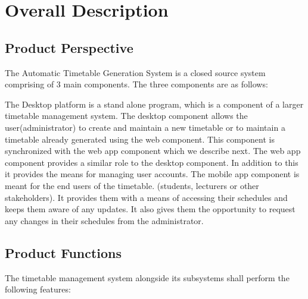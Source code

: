 \documentclass{scrreprt}
\begin{document}
\chapter{Overall Description}

\section{Product Perspective}
  The Automatic Timetable Generation System is a closed source system comprising of 3  main components. The three components are as follows:
  
The Desktop platform is a stand alone program, which is a component of a larger timetable management system. The desktop component allows the user(administrator) to create and maintain a new timetable or to maintain a timetable already generated using the web component. This component is synchronized with the web app component which we describe next. The web app component provides a similar role to the desktop component. In addition to this it provides the means for managing user accounts. The mobile app component is meant for the end users of the timetable. (students, lecturers or other stakeholders). It provides them with a means of accessing their schedules and keeps them aware of any  updates. It also gives them the opportunity to request any changes in their schedules from the administrator.

\section{Product Functions}
The timetable management system alongside its subsystems shall perform the following features:
\end{document}
